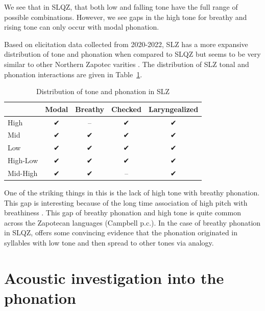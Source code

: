 \documentclass[12pt, letterpaper]{article}
\providecommand{\lsptoprule}{\midrule\toprule}
\providecommand{\lspbottomrule}{\bottomrule\midrule}
\begin{document}
We see that in SLQZ, that both low and falling tone have the full range of possible combinations. However, we see gaps in the high tone for breathy and rising tone can only occur with modal phonation. 

Based on elicitation data collected from 2020-2022, SLZ has a more expansive distribution of tone and phonation when compared to SLQZ but seems to be very similar to other Northern Zapotec varities \citep[e.g.,][]{avelinobecerraTopicsYalalagZapotec2004}. The distribution of SLZ tonal and phonation interactions are given in Table~\ref{tab:ToneVoiceQuality}. 
\begin{table}[!h]
	\caption{Distribution of tone and phonation in SLZ}
	\label{tab:ToneVoiceQuality}
	\centering

	\begin{tabular}{lcccc}
	\lsptoprule
		& \textbf{Modal} & \textbf{Breathy} & \textbf{Checked} & \textbf{Laryngealized} \\
	\hline
	High	& ✔ & -- & ✔ & ✔ \\
	Mid	& ✔ & ✔ & ✔ & ✔\\
	Low	& ✔	& ✔ & ✔ & ✔\\
	High-Low	& ✔	& ✔ & ✔ & ✔\\
	Mid-High	& ✔	& ✔ & -- & ✔ \\
	\lspbottomrule
	\end{tabular}
\end{table}

One of the striking things in this is the lack of high tone with breathy phonation. This gap is interesting because of the long time association of high pitch with breathiness \citep[a good overview–of this association and other phoantion types–is found in][]{eslingVoiceQualityLaryngeal2019}. This gap of breathy phonation and high tone is quite common across the Zapotecan languages (Campbell p.c.). In the case of breathy phonation in SLQZ, \citet{uchiharaToneRegistrogenesisQuiavini2016} offers some convincing evidence that the phonation originated in syllables with low tone and then spread to other tones via analogy. 

\section{Acoustic investigation into the phonation} \label{sec:Acoustics}
\end{document}
